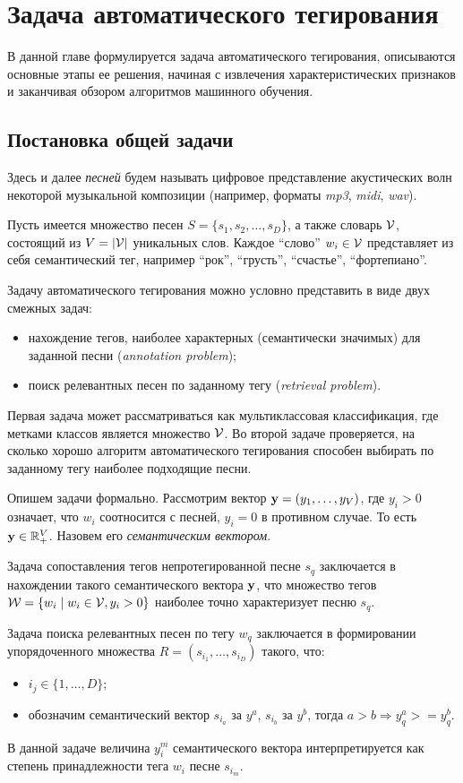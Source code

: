 \chapter{Задача автоматического тегирования}
\label{chapter1}

В данной главе формулируется задача автоматического тегирования, описываются основные этапы ее решения, 
начиная с извлечения характеристических признаков и заканчивая обзором алгоритмов машинного обучения.

\section{Постановка общей задачи}
Здесь и далее \emph{песней} будем называть цифровое представление акустических волн некоторой музыкальной композиции (например, форматы \emph{mp3}, \emph{midi}, \emph{wav}).

Пусть имеется множество песен $S = \{s_1, s_2, \ldots, s_D \}$, а также словарь $ \mathcal{V} $, состоящий из $V = |\mathcal{V}| $ уникальных слов. 
Каждое ``слово'' $w_i \in \mathcal{V}$ представляет из себя семантический тег, например ``рок'', ``грусть'', ``счастье'', ``фортепиано''.

Задачу автоматического тегирования можно условно представить в виде двух смежных задач: 
\begin{itemize}
 \item нахождение тегов, наиболее характерных (семантически значимых) для заданной песни (\emph{annotation problem});
 \item поиск релевантных песен по заданному тегу (\emph{retrieval problem}).
\end{itemize}

Первая задача может рассматриваться как мультиклассовая классификация, где метками классов является множество $\mathcal{V}$.
Во второй задаче проверяется, на сколько хорошо алгоритм автоматического тегирования способен выбирать по заданному тегу наиболее подходящие песни.

Опишем задачи формально.
Рассмотрим вектор $\mathbf{y} = (y_1, \ldots, y_V)$, где $y_i > 0$ означает, что $w_i$ соотносится с песней, $y_i = 0$ в противном случае. То есть $\mathbf{y} \in \mathbb{R}^{V}_{+}$.
Назовем его \emph{семантическим вектором}.

Задача сопоставления тегов непротегированной песне $s_q$ заключается в нахождении такого семантического вектора $\mathbf{y}$, 
что множество тегов $\mathcal{W} = \{w_i \mid w_i \in \mathcal{V}, y_i > 0\}$ наиболее точно характеризует песню $s_q$.

Задача поиска релевантных песен по тегу $w_q$ заключается в формировании упорядоченного множества $R = (s_{i_1}, \ldots, s_{i_D})$ такого, что:
\begin{itemize}
 \item $i_j \in \{1, \ldots, D \}$;
 \item обозначим семантический вектор $s_{i_a}$ за $y^a$, $s_{i_b}$ \ld за $y^b$, тогда $a > b \Rightarrow y^a_q >= y^b_q $.
\end{itemize}
В данной задаче величина $y^m_i$ семантического вектора интерпретируется как степень принадлежности тега $w_i$ песне $s_{i_m}$. 
 
